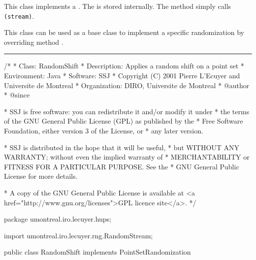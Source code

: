 
This class implements a
.
The  is
stored internally. The method  simply
calls
\texttt{(stream)}.

This class can be used as a base class to implement a specific
randomization by overriding method .

\bigskip\hrule\bigskip

\begin{code}
\begin{hide}
/*
 * Class:        RandomShift
 * Description:  Applies a random shift on a point set
 * Environment:  Java
 * Software:     SSJ 
 * Copyright (C) 2001  Pierre L'Ecuyer and Universite de Montreal
 * Organization: DIRO, Universite de Montreal
 * @author       
 * @since

 * SSJ is free software: you can redistribute it and/or modify it under
 * the terms of the GNU General Public License (GPL) as published by the
 * Free Software Foundation, either version 3 of the License, or
 * any later version.

 * SSJ is distributed in the hope that it will be useful,
 * but WITHOUT ANY WARRANTY; without even the implied warranty of
 * MERCHANTABILITY or FITNESS FOR A PARTICULAR PURPOSE.  See the
 * GNU General Public License for more details.

 * A copy of the GNU General Public License is available at
   <a href="http://www.gnu.org/licenses">GPL licence site</a>.
 */
\end{hide}
package umontreal.iro.lecuyer.hups;
\begin{hide}
 import umontreal.iro.lecuyer.rng.RandomStream;

\end{hide}
public class RandomShift implements PointSetRandomization\begin{hide} {
   protected RandomStream stream;
\end{hide}
\end{code}
